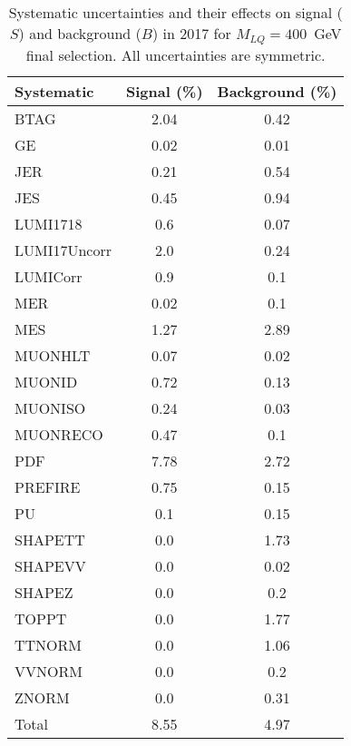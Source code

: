 \begin{table}[htbp]
\begin{center}
\caption{Systematic uncertainties and their effects on signal ($S$) and background ($B$) in 2017 for $M_{LQ}=400$~GeV final selection. All uncertainties are symmetric.}
\begin{tabular}{lcc}
\hline\hline
Systematic & Signal (\%) & Background (\%) \\ \hline 
BTAG & 2.04 & 0.42\\ 
GE & 0.02 & 0.01\\ 
JER & 0.21 & 0.54\\ 
JES & 0.45 & 0.94\\ 
LUMI1718 & 0.6 & 0.07\\ 
LUMI17Uncorr & 2.0 & 0.24\\ 
LUMICorr & 0.9 & 0.1\\ 
MER & 0.02 & 0.1\\ 
MES & 1.27 & 2.89\\ 
MUONHLT & 0.07 & 0.02\\ 
MUONID & 0.72 & 0.13\\ 
MUONISO & 0.24 & 0.03\\ 
MUONRECO & 0.47 & 0.1\\ 
PDF & 7.78 & 2.72\\ 
PREFIRE & 0.75 & 0.15\\ 
PU & 0.1 & 0.15\\ 
SHAPETT & 0.0 & 1.73\\ 
SHAPEVV & 0.0 & 0.02\\ 
SHAPEZ & 0.0 & 0.2\\ 
TOPPT & 0.0 & 1.77\\ 
TTNORM & 0.0 & 1.06\\ 
VVNORM & 0.0 & 0.2\\ 
ZNORM & 0.0 & 0.31\\ 
Total & 8.55 & 4.97\\ \hline \hline
\end{tabular}
\label{tab:SysUncertainties_uujj_400}
\end{center}
\end{table}

